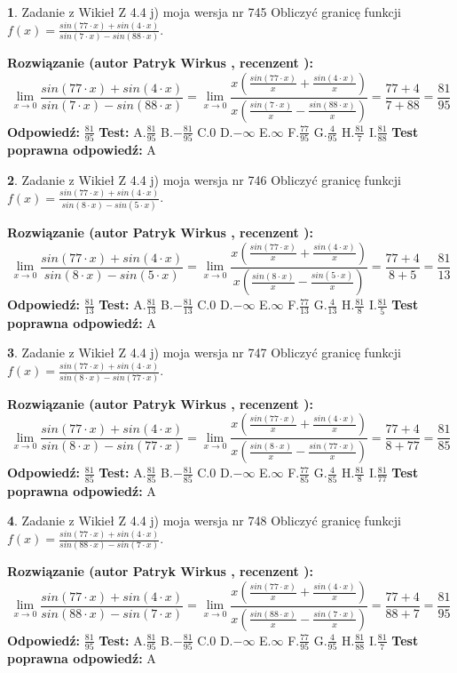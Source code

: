 \documentclass[12pt, a4paper]{article}
\theoremstyle{definition} %
\newtheorem{zad}{}
\newcommand{\zadStart}[1]{\begin{zad}#1\newline}
\newcommand{\zadStop}{\end{zad}}
\newcommand{\rozwStart}[2]{\noindent \textbf{Rozwiązanie (autor #1 , recenzent #2): }\newline}
\newcommand{\rozwStop}{\newline}
\newcommand{\odpStart}{\noindent \textbf{Odpowiedź:}\newline}
\newcommand{\odpStop}{\newline}
\newcommand{\testStart}{\noindent \textbf{Test:}\newline}
\newcommand{\testStop}{\newline}
\newcommand{\kluczStart}{\noindent \textbf{Test poprawna odpowiedź:}\newline}
\newcommand{\kluczStop}{\newline}
\begin{document}
\zadStart{Zadanie z Wikieł Z 4.4 j) moja wersja nr 745}
Obliczyć granicę funkcji $f(x)=\frac{sin(77\cdot x) +sin(4\cdot x)}{sin(7\cdot x) -sin(88\cdot x)}$.
\zadStop
\rozwStart{Patryk Wirkus}{}
$$\lim\limits_{x\to 0}\frac{sin(77\cdot x) +sin(4\cdot x)}{sin(7\cdot x) -sin(88\cdot x)}=\lim\limits_{x\to 0}\frac{x(\frac{sin(77\cdot x)}{x}+\frac{sin(4\cdot x)}{x})}{x(\frac{sin(7\cdot x)}{x}-\frac{sin(88\cdot x)}{x})}=\frac{77+4}{7+88} = \frac{81}{95}$$
\rozwStop
\odpStart
$\frac{81}{95}$
\odpStop
\testStart
A.$\frac{81}{95}$
B.$-\frac{81}{95}$
C.$0$
D.$-\infty$
E.$\infty$
F.$\frac{77}{95}$
G.$\frac{4}{95}$
H.$\frac{81}{7}$
I.$\frac{81}{88}$
\testStop
\kluczStart
A
\kluczStop



\zadStart{Zadanie z Wikieł Z 4.4 j) moja wersja nr 746}
Obliczyć granicę funkcji $f(x)=\frac{sin(77\cdot x) +sin(4\cdot x)}{sin(8\cdot x) -sin(5\cdot x)}$.
\zadStop
\rozwStart{Patryk Wirkus}{}
$$\lim\limits_{x\to 0}\frac{sin(77\cdot x) +sin(4\cdot x)}{sin(8\cdot x) -sin(5\cdot x)}=\lim\limits_{x\to 0}\frac{x(\frac{sin(77\cdot x)}{x}+\frac{sin(4\cdot x)}{x})}{x(\frac{sin(8\cdot x)}{x}-\frac{sin(5\cdot x)}{x})}=\frac{77+4}{8+5} = \frac{81}{13}$$
\rozwStop
\odpStart
$\frac{81}{13}$
\odpStop
\testStart
A.$\frac{81}{13}$
B.$-\frac{81}{13}$
C.$0$
D.$-\infty$
E.$\infty$
F.$\frac{77}{13}$
G.$\frac{4}{13}$
H.$\frac{81}{8}$
I.$\frac{81}{5}$
\testStop
\kluczStart
A
\kluczStop



\zadStart{Zadanie z Wikieł Z 4.4 j) moja wersja nr 747}
Obliczyć granicę funkcji $f(x)=\frac{sin(77\cdot x) +sin(4\cdot x)}{sin(8\cdot x) -sin(77\cdot x)}$.
\zadStop
\rozwStart{Patryk Wirkus}{}
$$\lim\limits_{x\to 0}\frac{sin(77\cdot x) +sin(4\cdot x)}{sin(8\cdot x) -sin(77\cdot x)}=\lim\limits_{x\to 0}\frac{x(\frac{sin(77\cdot x)}{x}+\frac{sin(4\cdot x)}{x})}{x(\frac{sin(8\cdot x)}{x}-\frac{sin(77\cdot x)}{x})}=\frac{77+4}{8+77} = \frac{81}{85}$$
\rozwStop
\odpStart
$\frac{81}{85}$
\odpStop
\testStart
A.$\frac{81}{85}$
B.$-\frac{81}{85}$
C.$0$
D.$-\infty$
E.$\infty$
F.$\frac{77}{85}$
G.$\frac{4}{85}$
H.$\frac{81}{8}$
I.$\frac{81}{77}$
\testStop
\kluczStart
A
\kluczStop



\zadStart{Zadanie z Wikieł Z 4.4 j) moja wersja nr 748}
Obliczyć granicę funkcji $f(x)=\frac{sin(77\cdot x) +sin(4\cdot x)}{sin(88\cdot x) -sin(7\cdot x)}$.
\zadStop
\rozwStart{Patryk Wirkus}{}
$$\lim\limits_{x\to 0}\frac{sin(77\cdot x) +sin(4\cdot x)}{sin(88\cdot x) -sin(7\cdot x)}=\lim\limits_{x\to 0}\frac{x(\frac{sin(77\cdot x)}{x}+\frac{sin(4\cdot x)}{x})}{x(\frac{sin(88\cdot x)}{x}-\frac{sin(7\cdot x)}{x})}=\frac{77+4}{88+7} = \frac{81}{95}$$
\rozwStop
\odpStart
$\frac{81}{95}$
\odpStop
\testStart
A.$\frac{81}{95}$
B.$-\frac{81}{95}$
C.$0$
D.$-\infty$
E.$\infty$
F.$\frac{77}{95}$
G.$\frac{4}{95}$
H.$\frac{81}{88}$
I.$\frac{81}{7}$
\testStop
\kluczStart
A
\kluczStop
\end{document}
